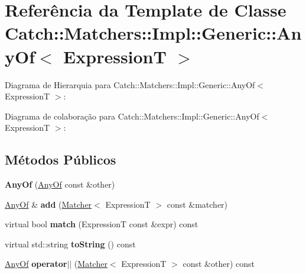 \hypertarget{classCatch_1_1Matchers_1_1Impl_1_1Generic_1_1AnyOf}{}\section{Referência da Template de Classe Catch\+:\+:Matchers\+:\+:Impl\+:\+:Generic\+:\+:Any\+Of$<$ ExpressionT $>$}
\label{classCatch_1_1Matchers_1_1Impl_1_1Generic_1_1AnyOf}


Diagrama de Hierarquia para Catch\+:\+:Matchers\+:\+:Impl\+:\+:Generic\+:\+:Any\+Of$<$ ExpressionT $>$\+:


Diagrama de colaboração para Catch\+:\+:Matchers\+:\+:Impl\+:\+:Generic\+:\+:Any\+Of$<$ ExpressionT $>$\+:
\subsection*{Métodos Públicos}
\begin{DoxyCompactItemize}
\item 
{\bfseries Any\+Of} (\hyperlink{classCatch_1_1Matchers_1_1Impl_1_1Generic_1_1AnyOf}{Any\+Of} const \&other)\hypertarget{classCatch_1_1Matchers_1_1Impl_1_1Generic_1_1AnyOf_a74fbc05b32d334fcbfd0fae0163a404e}{}\label{classCatch_1_1Matchers_1_1Impl_1_1Generic_1_1AnyOf_a74fbc05b32d334fcbfd0fae0163a404e}

\item 
\hyperlink{classCatch_1_1Matchers_1_1Impl_1_1Generic_1_1AnyOf}{Any\+Of} \& {\bfseries add} (\hyperlink{structCatch_1_1Matchers_1_1Impl_1_1Matcher}{Matcher}$<$ ExpressionT $>$ const \&matcher)\hypertarget{classCatch_1_1Matchers_1_1Impl_1_1Generic_1_1AnyOf_a3bce94b627551e5f96c5f9c6060413f0}{}\label{classCatch_1_1Matchers_1_1Impl_1_1Generic_1_1AnyOf_a3bce94b627551e5f96c5f9c6060413f0}

\item 
virtual bool {\bfseries match} (ExpressionT const \&expr) const \hypertarget{classCatch_1_1Matchers_1_1Impl_1_1Generic_1_1AnyOf_a2f97a08338e12deba541043a57d73db9}{}\label{classCatch_1_1Matchers_1_1Impl_1_1Generic_1_1AnyOf_a2f97a08338e12deba541043a57d73db9}

\item 
virtual std\+::string {\bfseries to\+String} () const \hypertarget{classCatch_1_1Matchers_1_1Impl_1_1Generic_1_1AnyOf_a7ecc6ec08b2018a643923a9d450aa328}{}\label{classCatch_1_1Matchers_1_1Impl_1_1Generic_1_1AnyOf_a7ecc6ec08b2018a643923a9d450aa328}

\item 
\hyperlink{classCatch_1_1Matchers_1_1Impl_1_1Generic_1_1AnyOf}{Any\+Of} {\bfseries operator$\vert$$\vert$} (\hyperlink{structCatch_1_1Matchers_1_1Impl_1_1Matcher}{Matcher}$<$ ExpressionT $>$ const \&other) const \hypertarget{classCatch_1_1Matchers_1_1Impl_1_1Generic_1_1AnyOf_a07f4ea2ae366a6521a5d7bff4522e8bf}{}\label{classCatch_1_1Matchers_1_1Impl_1_1Generic_1_1AnyOf_a07f4ea2ae366a6521a5d7bff4522e8bf}

\end{DoxyCompactItemize}
